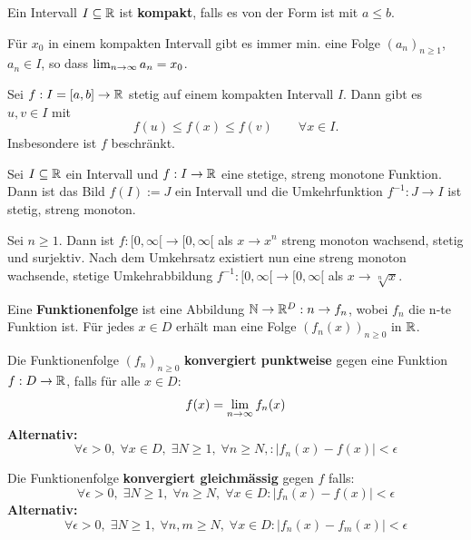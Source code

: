 \Def Ein Intervall $I \subseteq \mathbb{R}$ ist \textbf{kompakt}, falls es von der Form \text{[a,b]}  
ist mit $a \leq b$.

\Bem Für $x_0$ in einem kompakten Intervall gibt es immer min. eine Folge $(a_n)_{n \geq 1}$, $a_n \in I$, 
so dass $\lim_{n \rightarrow \infty} a_n = x_0$.

\begin{tcolorbox}
    \Satz Sei $f : I = [a,b] \to \mathbb{R}$ stetig auf einem kompakten Intervall $I$. Dann gibt es 
    $u, v \in I$ mit
    $$f(u) \leq f(x) \leq f(v) \quad \quad \forall x \in I.$$
    Insbesondere ist $f$ beschränkt.
\end{tcolorbox}


\columnbreak



\Satz Sei $I \subseteq \mathbb{R}$ ein Intervall und $f : I \to \mathbb{R}$ eine stetige, streng monotone Funktion.
Dann ist das Bild $f(I) := J$ ein Intervall und die Umkehrfunktion $f^{-1} : J \to I$ ist stetig,
streng monoton.

\Bsp Sei $n \geq 1$. Dann ist $f : [0, \infty[ \to [0, \infty[$ als $x \to x^n$ streng monoton wachsend,
stetig und surjektiv. Nach dem Umkehrsatz existiert nun  eine streng monoton wachsende, stetige Umkehrabbildung
$f^{-1} : [0, \infty[ \to [0, \infty[$ als $x \to \sqrt[n]{x}$.



\Def Eine \textbf{Funktionenfolge} ist eine Abbildung $\mathbb{N} \to \mathbb{R}^D : n \to f_n$, wobei $f_n$ die n-te Funktion
ist. Für jedes $x \in D$ erhält man eine Folge $(f_n(x))_{n \geq 0}$ in $\mathbb{R}$.

\begin{tcolorbox}
    Die Funktionenfolge  $(f_n)_{n \geq 0}$ \textbf{konvergiert punktweise} gegen eine Funktion 
    $f : D \to \mathbb{R}$, falls für alle $x \in D$:
    $$f(x) = \lim_{n \rightarrow \infty}{f_n(x)}$$
    \textbf{Alternativ:}
    $$\forall \epsilon > 0, \; \forall x \in D, \; \exists N \geq 1, \; \forall n \geq N, : |f_n(x) - f(x)| < \epsilon$$
\end{tcolorbox}


\begin{tcolorbox}
    Die Funktionenfolge \textbf{konvergiert gleichmässig} gegen $f$ falls:
    $$\forall \epsilon > 0, \; \exists N \geq 1, \; \forall n \geq N, \; \forall x \in D : |f_n(x) - f(x)| < \epsilon$$
    \textbf{Alternativ:}
    $$\forall \epsilon > 0, \; \exists N \geq 1, \; \forall n,m \geq N, \; \forall x \in D : |f_n(x) - f_m(x)| < \epsilon$$
\end{tcolorbox}

